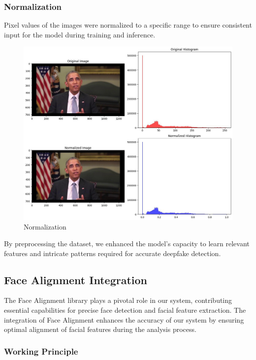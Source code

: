 \subsubsection{Normalization} Pixel values of the images were normalized to a specific range to ensure consistent input for the model during training and inference.

\begin{figure}[htbp]
    \centering
    \includegraphics[width=5in]{img/normalized.jpg}
    \caption{Normalization}
\end{figure}

By preprocessing the dataset, we enhanced the model's capacity to learn relevant features and intricate patterns required for accurate deepfake detection.

\subsection{Face Alignment Integration}

The Face Alignment library plays a pivotal role in our system, contributing essential capabilities for precise face detection and facial feature extraction. The integration of Face Alignment enhances the accuracy of our system by ensuring optimal alignment of facial features during the analysis process.

\subsubsection{Working Principle}

